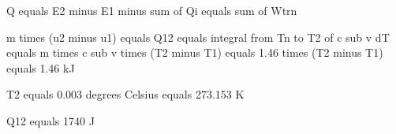 Q equals E2 minus E1 minus sum of Qi equals sum of Wtrn

m times (u2 minus u1) equals Q12 equals integral from Tn to T2 of c sub v dT equals m times c sub v times (T2 minus T1) equals 1.46 times (T2 minus T1) equals 1.46 kJ

T2 equals 0.003 degrees Celsius equals 273.153 K

Q12 equals 1740 J